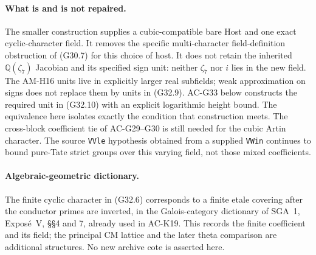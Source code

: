 \paragraph{What is and is not repaired.}
The smaller construction supplies a cubic-compatible bare Host
and one exact cyclic-character field.  It removes the specific
multi-character field-definition obstruction of (G30.7) for
this choice of host.  It does not retain the inherited
$\mathbb Q(\zeta_7)$ Jacobian and its specified sign unit:
neither $\zeta_7$ nor $i$ lies in the new field.
The AM-H16 units live in explicitly larger real subfields;
weak approximation on signs does not replace them by units
in (G32.9).  AC-G33 below constructs the required unit in (G32.10)
with an explicit logarithmic height bound.  The equivalence
here isolates exactly the condition that construction meets.
The cross-block coefficient tie of AC-G29--G30 is
still needed for the cubic Artin character.  The source
\texttt{VVle} hypothesis obtained from a supplied
\texttt{VWin} continues to bound pure-Tate strict groups
over this varying field, not those mixed coefficients.

\paragraph{Algebraic-geometric dictionary.}
The finite cyclic character in (G32.6) corresponds to a finite
etale covering after the conductor primes are inverted, in the
Galois-category dictionary of SGA~1, Expos\'e~V, \S\S4 and 7,
already used in AC-K19.  This records the finite coefficient
and its field; the principal CM lattice and the later theta
comparison are additional structures.  No new archive cote
is asserted here.
